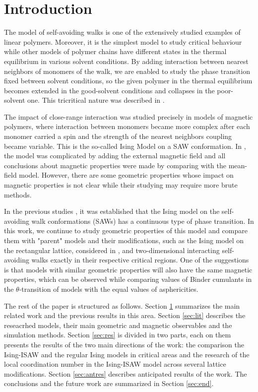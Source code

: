 \section{Introduction}
\label{sec:in}

The model of self-avoiding walks is one of the extensively studied examples of linear polymers. 
Moreover, it is the simplest model to study critical behaviour while other models of polymer chains have different states in the thermal equilibrium in various solvent conditions. 
By adding interaction between nearest neighbors of monomers of the walk, we are enabled to study the phase transition fixed between solvent conditions, so the given polymer in the thermal equilibrium becomes extended in the good-solvent conditions and collapses in the poor-solvent one. 
This tricritical nature was described in \cite{Gennes1979}.

The impact of close-range interaction was studied precisely in models of magnetic polymers, where interaction between monomers became more complex after each monomer carried a spin and the strength of the nearest neighbors coupling became variable. 
This is the so-called Ising Model on a SAW conformation. 
In \cite{Garel1999}, the model was complicated by adding the external magnetic field and all conclusions about magnetic properties were made by comparing with the mean-field model. 
However, there are some geometric properties whose impact on magnetic properties is not clear while their studying may require more brute methods.

In the previous studies \cite{faizullina2021critical}, it was established that the Ising model on the self-avoiding walk conformations (SAWs) has a continuous type of phase transition. 
In this work, we continue to study geometric properties of this model and compare them with "parent" models and their modifications, such as the Ising model on the rectangular lattice, considered in \cite{Selke2006}, and two-dimensional interacting self-avoiding walks exactly in their respective critical regions. 
One of the suggestions is that models with similar geometric properties will also have the same magnetic properties, which can be observed while comparing values of Binder cumulants in the $\theta$-transition of models with the equal values of asphericities.

The rest of the paper is structured as follows. 
Section \ref{sec:in} summarizes the main related work and the previous results in this area. 
Section \ref{sec:lit} describes the reseacrhed models, their main geometric and magnetic observables and the simulation methods. 
Section \ref{sec:res} is divided in two parts, each on them presents the results of the two main directions of the work: the comparison the Ising-ISAW and the regular Ising models in critical areas and the research of the local coordination number in the Ising-ISAW model across several lattice modifications.
Section \ref{sec:antres} describes anticipated results of the work.
The conclusions and the future work are summarized in Section \ref{sec:end}.
